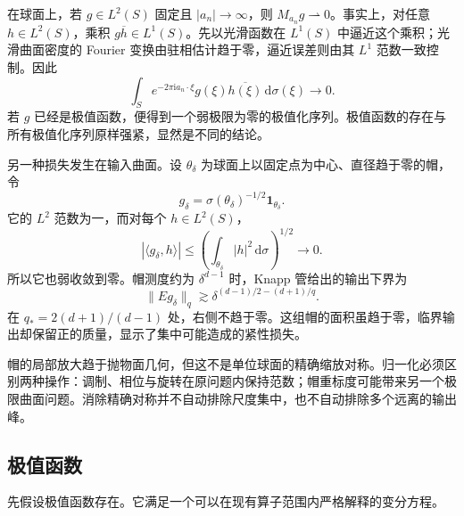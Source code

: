 \ProseParagraphBreak
在球面上，若 \(g\in L^2(S)\) 固定且 \(|a_n|\to\infty\)，则 \(M_{a_n}g\rightharpoonup0\)。事实上，对任意 \(h\in L^2(S)\)，乘积 \(g\overline h\in L^1(S)\)。先以光滑函数在 \(L^1(S)\) 中逼近这个乘积；光滑曲面密度的 Fourier 变换由驻相估计趋于零，逼近误差则由其 \(L^1\) 范数一致控制。因此
\[
 \int_S e^{-2\pi\mathrm i a_n\cdot\xi}
      g(\xi)\overline{h(\xi)}\,\mathrm d\sigma(\xi)\longrightarrow0.
\]
若 \(g\) 已经是极值函数，便得到一个弱极限为零的极值化序列。极值函数的存在与所有极值化序列原样强紧，显然是不同的结论。

\ProseParagraphBreak
另一种损失发生在输入曲面。设 \(\theta_\delta\) 为球面上以固定点为中心、直径趋于零的帽，令
\[
 g_\delta=\sigma(\theta_\delta)^{-1/2}\mathbf1_{\theta_\delta}.
\]
它的 \(L^2\) 范数为一，而对每个 \(h\in L^2(S)\)，
\[
 |\langle g_\delta,h\rangle|
 \leq\left(\int_{\theta_\delta}|h|^2\,\mathrm d\sigma\right)^{1/2}
 \longrightarrow0.
\]
所以它也弱收敛到零。帽测度约为 \(\delta^{d-1}\) 时，Knapp 管给出的输出下界为
\[
 \|Eg_\delta\|_q
 \gtrsim \delta^{(d-1)/2-(d+1)/q}.
\]
在 \(q_*=2(d+1)/(d-1)\) 处，右侧不趋于零。这组帽的面积虽趋于零，临界输出却保留正的质量，显示了集中可能造成的紧性损失。

帽的局部放大趋于抛物面几何，但这不是单位球面的精确缩放对称。归一化必须区别两种操作：调制、相位与旋转在原问题内保持范数；帽重标度可能带来另一个极限曲面问题。消除精确对称并不自动排除尺度集中，也不自动排除多个远离的输出峰。

\subsection{极值函数}
\label{b2:subsec:230504}

先假设极值函数存在。它满足一个可以在现有算子范围内严格解释的变分方程。

